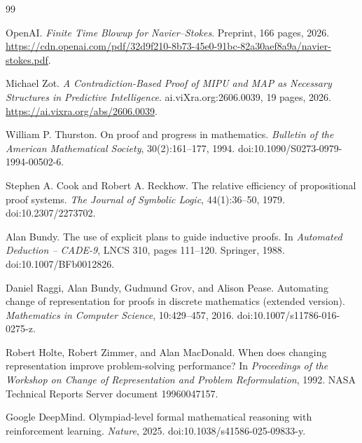 \documentclass[11pt]{article}
\numberwithin{equation}{section}
\theoremstyle{highend}
\theoremstyle{definition}
\begin{document}
\begin{thebibliography}{99}

OpenAI.
\newblock \emph{Finite Time Blowup for Navier--Stokes}.
\newblock Preprint, 166 pages, 2026.
\newblock \url{https://cdn.openai.com/pdf/32d9f210-8b73-45e0-91bc-82a30aef8a9a/navier-stokes.pdf}.

Michael Zot.
\newblock \emph{A Contradiction-Based Proof of MIPU and MAP as Necessary Structures in Predictive Intelligence}.
\newblock ai.viXra.org:2606.0039, 19 pages, 2026.
\newblock \url{https://ai.vixra.org/abs/2606.0039}.

William P. Thurston.
\newblock On proof and progress in mathematics.
\newblock \emph{Bulletin of the American Mathematical Society}, 30(2):161--177, 1994.
\newblock doi:10.1090/S0273-0979-1994-00502-6.

Stephen A. Cook and Robert A. Reckhow.
\newblock The relative efficiency of propositional proof systems.
\newblock \emph{The Journal of Symbolic Logic}, 44(1):36--50, 1979.
\newblock doi:10.2307/2273702.

Alan Bundy.
\newblock The use of explicit plans to guide inductive proofs.
\newblock In \emph{Automated Deduction -- CADE-9}, LNCS 310, pages 111--120. Springer, 1988.
\newblock doi:10.1007/BFb0012826.

Daniel Raggi, Alan Bundy, Gudmund Grov, and Alison Pease.
\newblock Automating change of representation for proofs in discrete mathematics (extended version).
\newblock \emph{Mathematics in Computer Science}, 10:429--457, 2016.
\newblock doi:10.1007/s11786-016-0275-z.

Robert Holte, Robert Zimmer, and Alan MacDonald.
\newblock When does changing representation improve problem-solving performance?
\newblock In \emph{Proceedings of the Workshop on Change of Representation and Problem Reformulation}, 1992.
\newblock NASA Technical Reports Server document 19960047157.

Google DeepMind.
\newblock Olympiad-level formal mathematical reasoning with reinforcement learning.
\newblock \emph{Nature}, 2025.
\newblock doi:10.1038/s41586-025-09833-y.

\end{thebibliography}
\end{document}

